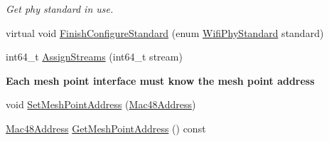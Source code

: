\begin{DoxyCompactItemize}
\begin{DoxyCompactList}\small\item\em Get phy standard in use. \end{DoxyCompactList}\item 
virtual void \hyperlink{classns3_1_1MeshWifiInterfaceMac_a3eee38ccb3ae4469618acae24c519155}{Finish\+Configure\+Standard} (enum \hyperlink{group__wifi_ga1299834f4e1c615af3ca738033b76a49}{Wifi\+Phy\+Standard} standard)
\item 
int64\+\_\+t \hyperlink{classns3_1_1MeshWifiInterfaceMac_aa1879d91c7090f6ab0a5336c41fd1985}{Assign\+Streams} (int64\+\_\+t stream)
\end{DoxyCompactItemize}
\begin{Indent}{\bf Each mesh point interface must know the mesh point address}\par
\begin{DoxyCompactItemize}
\item 
void \hyperlink{classns3_1_1MeshWifiInterfaceMac_a782da2b589a8c36bf48bf518e3f37124}{Set\+Mesh\+Point\+Address} (\hyperlink{classns3_1_1Mac48Address}{Mac48\+Address})
\item 
\hyperlink{classns3_1_1Mac48Address}{Mac48\+Address} \hyperlink{classns3_1_1MeshWifiInterfaceMac_ae1a3d3670cdc5be340e749b19d51da7b}{Get\+Mesh\+Point\+Address} () const 
\end{DoxyCompactItemize}
\end{Indent}
